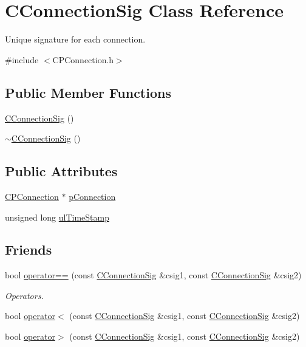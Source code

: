 \hypertarget{class_c_connection_sig}{\section{\-C\-Connection\-Sig \-Class \-Reference}
\label{class_c_connection_sig}
}


\-Unique signature for each connection.  




{\ttfamily \#include $<$\-C\-P\-Connection.\-h$>$}

\subsection*{\-Public \-Member \-Functions}
\begin{DoxyCompactItemize}
\item 
\hyperlink{class_c_connection_sig_a96cc8d3008e19e3941f77aacedbdadee}{\-C\-Connection\-Sig} ()
\item 
\hyperlink{class_c_connection_sig_a53317c314498d82a97a47f60d7ec5f4a}{$\sim$\-C\-Connection\-Sig} ()
\end{DoxyCompactItemize}
\subsection*{\-Public \-Attributes}
\begin{DoxyCompactItemize}
\item 
\hyperlink{class_c_p_connection}{\-C\-P\-Connection} $\ast$ \hyperlink{class_c_connection_sig_a6941b71b7d8397e19be5cb3996b50aae}{p\-Connection}
\item 
unsigned long \hyperlink{class_c_connection_sig_a8a9b3290adb6c0cabc4f9821a9683a29}{ul\-Time\-Stamp}
\end{DoxyCompactItemize}
\subsection*{\-Friends}
\begin{DoxyCompactItemize}
\item 
bool \hyperlink{class_c_connection_sig_a108267e3b776ae5703cf784ec5307ebb}{operator==} (const \hyperlink{class_c_connection_sig}{\-C\-Connection\-Sig} \&csig1, const \hyperlink{class_c_connection_sig}{\-C\-Connection\-Sig} \&csig2)
\begin{DoxyCompactList}\small\item\em \-Operators. \end{DoxyCompactList}\item 
bool \hyperlink{class_c_connection_sig_a76e8e1e9c79d319028a7003284aa75e1}{operator$<$} (const \hyperlink{class_c_connection_sig}{\-C\-Connection\-Sig} \&csig1, const \hyperlink{class_c_connection_sig}{\-C\-Connection\-Sig} \&csig2)
\item 
bool \hyperlink{class_c_connection_sig_a64a4e21ad9f3fc58a12a9bf787c525be}{operator$>$} (const \hyperlink{class_c_connection_sig}{\-C\-Connection\-Sig} \&csig1, const \hyperlink{class_c_connection_sig}{\-C\-Connection\-Sig} \&csig2)
\end{DoxyCompactItemize}


